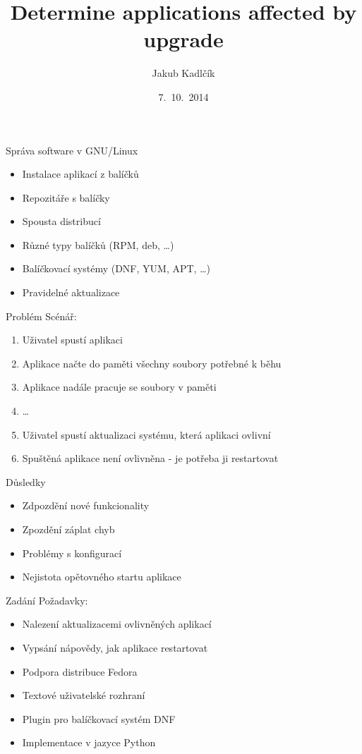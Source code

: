 \documentclass{beamer}
\title[tracer]{Determine applications affected by upgrade}
\author{Jakub Kadlčík}
\institute[UP]{Univerzita Palackého v Olomouci}
\date{7.~10.~2014}
\begin{document}
	\begin{frame}
		\titlepage
	\end{frame}

	\begin{frame}{Správa software v GNU/Linux}
		\begin{itemize}
			\item Instalace aplikací z balíčků
			\item Repozitáře s balíčky
			\item Spousta distribucí
			\item Různé typy balíčků (RPM, deb, \dots)
			\item Balíčkovací systémy (DNF, YUM, APT, \dots)
			\item Pravidelné aktualizace
		\end{itemize}
	\end{frame}

	\begin{frame}{Problém}
		Scénář:
		\begin{enumerate}
			\item Uživatel spustí aplikaci
			\item Aplikace načte do paměti všechny soubory potřebné k běhu
			\item Aplikace nadále pracuje se soubory v paměti
			\item \dots
			\item Uživatel spustí aktualizaci systému, která aplikaci ovlivní
			\item Spuštěná aplikace není ovlivněna - je potřeba ji restartovat
		\end{enumerate}
	\end{frame}

	\begin{frame}{Důsledky}
		\begin{itemize}
			\item Zdpozdění nové funkcionality
			\item Zpozdění záplat chyb
			\item Problémy s konfigurací
			\item Nejistota opětovného startu aplikace
		\end{itemize}
	\end{frame}

	\begin{frame}{Zadání}
		Požadavky:
		\begin{itemize}
			\item Nalezení aktualizacemi ovlivněných aplikací
			\item Vypsání nápovědy, jak aplikace restartovat
		\end{itemize}

		\begin{itemize}
			\item Podpora distribuce Fedora
			\item Textové uživatelské rozhraní
			\item Plugin pro balíčkovací systém DNF
			\item Implementace v jazyce Python
		\end{itemize}
	\end{frame}
\end{document}
